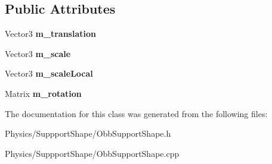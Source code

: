 \subsection*{Public Attributes}
\begin{DoxyCompactItemize}
\item 
\mbox{\label{classObbSupportShape_a259da8ed9b5bbe16b6cf755c453b7e52}} 
Vector3 {\bfseries m\+\_\+translation}
\item 
\mbox{\label{classObbSupportShape_ad038412b2e8a47a570dd93c260c9eeb5}} 
Vector3 {\bfseries m\+\_\+scale}
\item 
\mbox{\label{classObbSupportShape_a665fb1c1863f1868478d1638d88d1b2d}} 
Vector3 {\bfseries m\+\_\+scale\+Local}
\item 
\mbox{\label{classObbSupportShape_a54e4e5cac1d6c941473fc918a5c54ac6}} 
Matrix {\bfseries m\+\_\+rotation}
\end{DoxyCompactItemize}


The documentation for this class was generated from the following files\+:\begin{DoxyCompactItemize}
\item 
Physics/\+Suppport\+Shape/Obb\+Support\+Shape.\+h\item 
Physics/\+Suppport\+Shape/Obb\+Support\+Shape.\+cpp\end{DoxyCompactItemize}
